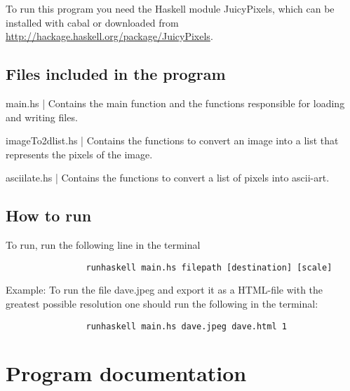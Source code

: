 \documentclass[12pt, a4paper]{article}
\begin{document}
	To run this program you need the Haskell module JuicyPixels, which can be installed with cabal or downloaded from \url{http://hackage.haskell.org/package/JuicyPixels}. 
		
		

	
		\subsection{Files included in the program }
		
		main.hs | Contains the main function and the functions responsible for loading and writing files.

		imageTo2dlist.hs | Contains the functions to convert an image into a list that represents the pixels of the image.

		asciilate.hs | Contains the functions to convert a list of pixels into ascii-art.
			
		\subsection{How to run}

		To run, run the following line in the terminal
		\begin{footnotesize}
			\begin{verbatim}
				runhaskell main.hs filepath [destination] [scale]
			\end{verbatim}
		\end{footnotesize} 
		
		Example: To run the file dave.jpeg and export it as a HTML-file with the greatest possible resolution one should run the following in the terminal:
		
		\begin{footnotesize}
			\begin{verbatim}
				runhaskell main.hs dave.jpeg dave.html 1
			\end{verbatim}
		\end{footnotesize} 

	\section{Program documentation}
\end{document}
